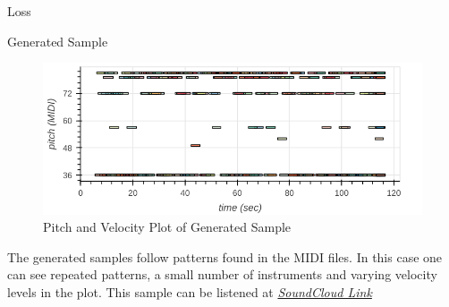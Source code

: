 \documentclass[final]{beamer}
\newlength{\onecolwid}
\newlength{\twocolwid}
\begin{document}
\begin{frame}[t]
\begin{columns}[t]
\begin{column}{\twocolwid}
\begin{columns}[t,totalwidth=\twocolwid]
\begin{column}{\onecolwid}
\begin{block}{Loss}
\end{block}



\begin{alertblock}{Generated Sample}


\begin{figure}
\includegraphics[width=0.9\linewidth]{winter_planet_midi_plot.png}
\caption{Pitch and Velocity Plot of Generated Sample}
\end{figure}

The generated samples follow patterns found in the MIDI files. In this case one can see repeated patterns, a small number of instruments and varying velocity levels in the plot. This sample can be listened at \href{https://soundcloud.com/saravana-r-389436812/cs236-multi-instrument-music-generation-using-vae?si=53eaea6cb734413d80f88bcabc25d3c4}{\textit{SoundCloud Link}}

\end{alertblock} 

\end{column} %

\end{columns} %



\begin{columns}[t,totalwidth=\twocolwid] %

\begin{column}{\onecolwid} %


\end{column}
\end{columns}
\end{column}
\end{columns}
\end{frame}
\end{document}
